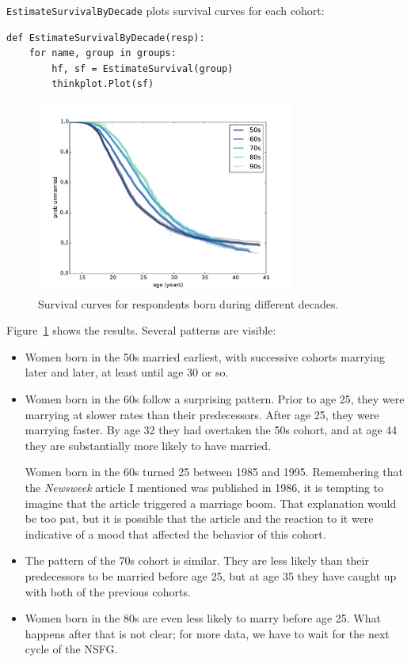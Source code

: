 \documentclass[12pt]{book}
\begin{document}
{\tt EstimateSurvivalByDecade} plots survival curves for each cohort:

\begin{verbatim}
def EstimateSurvivalByDecade(resp):
    for name, group in groups:
        hf, sf = EstimateSurvival(group)
        thinkplot.Plot(sf)
\end{verbatim}

\begin{figure}
\centerline{\includegraphics[height=2.5in]{figs/survival4.pdf}}
\caption{Survival curves for respondents born during different decades.}
\label{survival4}
\end{figure}

Figure~\ref{survival4} shows the results.  Several patterns are
visible:

\begin{itemize}

\item Women born in the 50s married earliest, with successive
  cohorts marrying later and later, at least until age 30 or so.

\item Women born in the 60s follow a surprising pattern.  Prior
to age 25, they were marrying at slower rates than their predecessors.
After age 25, they were marrying faster.  By age 32 they had overtaken
the 50s cohort, and at age 44 they are substantially more likely to
have married.

Women born in the 60s turned 25 between 1985 and 1995.  Remembering
that the {\it Newsweek} article I mentioned was published in 1986, it
is tempting to imagine that the article triggered a marriage boom.
That explanation would be too pat, but it is possible that the article
and the reaction to it were indicative of a mood that affected the
behavior of this cohort.

\item The pattern of the 70s cohort is similar.  They are less
likely than their predecessors to be married before age 25, but
at age 35 they have caught up with both of the previous cohorts.

\item Women born in the 80s are even less likely to marry before
age 25.  What happens after that is not clear; for more data, we
have to wait for the next cycle of the NSFG.

\end{itemize}
\end{document}
